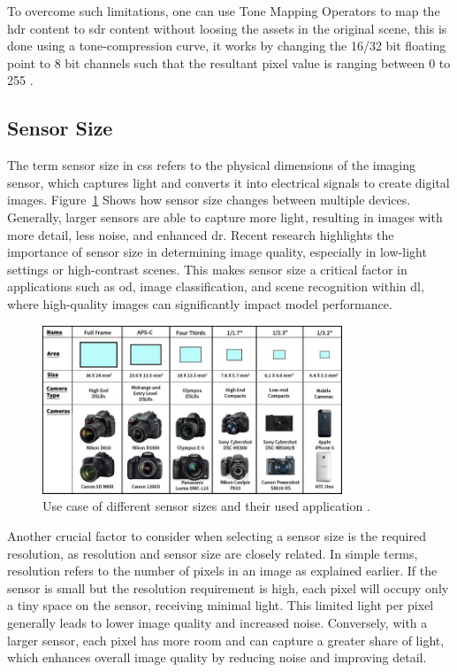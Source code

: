 To overcome such limitations, one can use Tone Mapping Operators to map the \gls{hdr} content to \gls{sdr} content without loosing the assets in the original scene, this is done using a tone-compression curve, it works by changing the 16/32 bit floating point to 8 bit channels such that the resultant pixel value is ranging between 0 to 255 \cite{HDR}.

\subsection{Sensor Size}
The term sensor size in \gls{cs}s refers to the physical dimensions of the imaging sensor, which captures light and converts it into electrical signals to create digital images. Figure~\ref{Sen_Size_chart} Shows how sensor size changes between multiple devices. Generally, larger sensors are able to capture more light, resulting in images with more detail, less noise, and enhanced \gls{dr}. Recent research highlights the importance of sensor size in determining image quality, especially in low-light settings or high-contrast scenes. This makes sensor size a critical factor in applications such as \gls{od}, image classification, and scene recognition within \gls{dl}, where high-quality images can significantly impact model performance.
\vspace{0.5 cm}
\begin{figure}[ht]
    \centering
    \includegraphics[width=0.8\textwidth]{Figures/sensor-chart.jpg}  
    \caption{Use case of different sensor sizes and their used application \cite{Sen_size_chart}.}
    \label{Sen_Size_chart}
\end{figure}

Another crucial factor to consider when selecting a sensor size is the required resolution, as resolution and sensor size are closely related. In simple terms, resolution refers to the number of pixels in an image as explained earlier. If the sensor is small but the resolution requirement is high, each pixel will occupy only a tiny space on the sensor, receiving minimal light. This limited light per pixel generally leads to lower image quality and increased noise. Conversely, with a larger sensor, each pixel has more room and can capture a greater share of light, which enhances overall image quality by reducing noise and improving detail.

